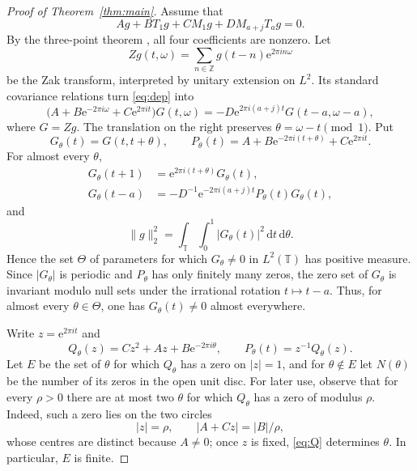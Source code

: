 \documentclass[10pt]{amsart}
\newcommand{\Z}{\mathbb Z}
\newcommand{\T}{\mathbb T}
\newcommand{\e}{\mathrm e}
\newcommand{\dd}{\,\mathrm d}
\begin{document}
\begin{proof}[Proof of Theorem~\ref{thm:main}]
Assume that
\begin{equation}\label{eq:dep}
Ag+BT_1g+CM_1g+DM_{a+j}T_ag=0.
\end{equation}
By the three-point theorem \cite{HRT}, all four coefficients are nonzero. Let
\[
Zg(t,\omega)=\sum_{n\in\Z}g(t-n)\e^{2\pi in\omega}
\]
be the Zak transform, interpreted by unitary extension on $L^2$. Its standard covariance
relations turn \eqref{eq:dep} into
\begin{equation}\label{eq:zak}
\bigl(A+B\e^{-2\pi i\omega}+C\e^{2\pi it}\bigr)G(t,\omega)
=-D\e^{2\pi i(a+j)t}G(t-a,\omega-a),
\end{equation}
where $G=Zg$. The translation on the right preserves $\theta=\omega-t\pmod1$. Put
\[
G_\theta(t)=G(t,t+\theta),\qquad
P_\theta(t)=A+B\e^{-2\pi i(t+\theta)}+C\e^{2\pi it}.
\]
For almost every $\theta$,
\begin{align}
G_\theta(t+1)&=\e^{2\pi i(t+\theta)}G_\theta(t),\label{eq:quasi}\\
G_\theta(t-a)&=-D^{-1}\e^{-2\pi i(a+j)t}P_\theta(t)G_\theta(t),\label{eq:fibre}
\end{align}
and
\begin{equation}\label{eq:fubini}
\|g\|_2^2=\int_\T\int_0^1|G_\theta(t)|^2\dd t\dd\theta.
\end{equation}
Hence the set $\Theta$ of parameters for which $G_\theta\neq0$ in $L^2(\T)$ has positive
measure. Since $|G_\theta|$ is periodic and $P_\theta$ has only finitely many zeros, the zero
set of $G_\theta$ is invariant modulo null sets under the irrational rotation $t\mapsto t-a$.
Thus, for almost every $\theta\in\Theta$, one has $G_\theta(t)\neq0$ almost everywhere.

Write $z=\e^{2\pi it}$ and
\begin{equation}\label{eq:Q}
Q_\theta(z)=Cz^2+Az+B\e^{-2\pi i\theta},
\qquad P_\theta(t)=z^{-1}Q_\theta(z).
\end{equation}
Let $E$ be the set of $\theta$ for which $Q_\theta$ has a zero on $|z|=1$, and for
$\theta\notin E$ let $N(\theta)$ be the number of its zeros in the open unit disc.
For later use, observe that for every $\rho>0$ there are at most two $\theta$ for which
$Q_\theta$ has a zero of modulus $\rho$. Indeed, such a zero lies on the two circles
\[
|z|=\rho,
\qquad |A+Cz|=|B|/\rho,
\]
whose centres are distinct because $A\neq0$; once $z$ is fixed, \eqref{eq:Q} determines
$\theta$. In particular, $E$ is finite.


\end{proof}
\end{document}
